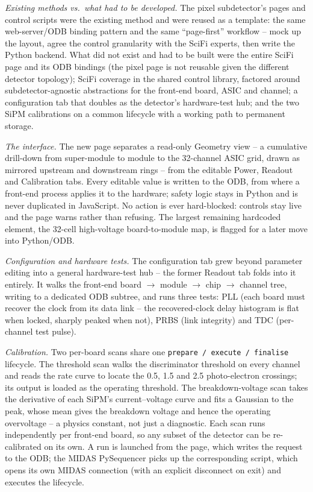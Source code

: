 \documentclass[12pt,a4paper]{article}
\newcommand{\pill}[1]{\textit{#1}\;}   %
\begin{document}
\pill{Existing methods vs.\ what had to be developed.}
The pixel subdetector's pages and control scripts were the existing method and
were reused as a template: the same web-server/ODB binding pattern and the same
``page-first'' workflow -- mock up the layout, agree the control granularity
with the SciFi experts, then write the Python backend. What did not exist and
had to be built were the entire SciFi page and its ODB bindings (the pixel page
is not reusable given the different detector topology); SciFi coverage in the
shared control library, factored around subdetector-agnostic abstractions for
the front-end board, ASIC and channel; a configuration tab that doubles as the
detector's hardware-test hub; and the two SiPM calibrations on a common
lifecycle with a working path to permanent storage.

\pill{The interface.}
The new page separates a read-only Geometry view -- a cumulative drill-down from
super-module to module to the 32-channel ASIC grid, drawn as mirrored upstream
and downstream rings -- from the editable Power, Readout and Calibration tabs.
Every editable value is written to the ODB, from where a front-end process
applies it to the hardware; safety logic stays in Python and is never duplicated
in JavaScript. No action is ever hard-blocked: controls stay live and the page
warns rather than refusing. The largest remaining hardcoded element, the 32-cell
high-voltage board-to-module map, is flagged for a later move into Python/ODB.

\pill{Configuration and hardware tests.}
The configuration tab grew beyond parameter editing into a general
hardware-test hub -- the former Readout tab folds into it entirely. It walks the
front-end board $\to$ module $\to$ chip $\to$ channel tree, writing to a
dedicated ODB subtree, and runs three tests: PLL (each board must recover the
clock from its data link -- the recovered-clock delay histogram is flat when
locked, sharply peaked when not), PRBS (link integrity) and TDC (per-channel
test pulse).

\pill{Calibration.}
Two per-board scans share one \texttt{prepare\,/\,execute\,/\,finalise}
lifecycle. The threshold scan walks the discriminator threshold on every channel
and reads the rate curve to locate the 0.5, 1.5 and 2.5 photo-electron
crossings; its output is loaded as the operating threshold. The
breakdown-voltage scan takes the derivative of each SiPM's current--voltage
curve and fits a Gaussian to the peak, whose mean gives the breakdown voltage
and hence the operating overvoltage -- a physics constant, not just a
diagnostic. Each scan runs independently per front-end board, so any subset of
the detector can be re-calibrated on its own. A run is launched from the page,
which writes the request to the ODB; the MIDAS PySequencer picks up the
corresponding script, which opens its own MIDAS connection (with an explicit
disconnect on exit) and executes the lifecycle.
\end{document}
